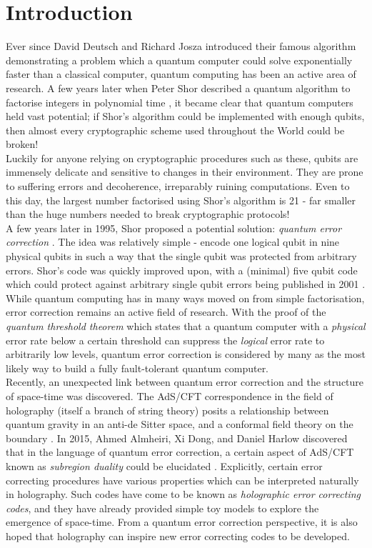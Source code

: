 \documentclass[12pt,a4paper]{report}
\numberwithin{equation}{section}
\theoremstyle{definition}
\theoremstyle{theorem}
\theoremstyle{theorem}
\theoremstyle{example}
\theoremstyle{definition}
\begin{document}
\chapter{Introduction}
Ever since David Deutsch and Richard Josza introduced their famous algorithm \cite{DJ} demonstrating a problem which a quantum computer could solve exponentially faster than a classical computer, quantum computing has been an active area of research. A few years later when Peter Shor described a quantum algorithm to factorise integers in polynomial time \cite{Shor}, it became clear that quantum computers held vast potential; if Shor's algorithm could be implemented with enough qubits, then almost every cryptographic scheme used throughout the World could be broken!\\
Luckily for anyone relying on cryptographic procedures such as these, qubits are immensely delicate and sensitive to changes in their environment. They are prone to suffering errors and decoherence, irreparably ruining computations. Even to this day, the largest number factorised using Shor's algorithm is 21 \cite{FactorRecord} - far smaller than the huge numbers needed to break cryptographic protocols!\\
A few years later in 1995, Shor proposed a potential solution: \textit{quantum error correction} \cite{PhysRevA.52.R2493}. The idea was relatively simple - encode one logical qubit in nine physical qubits in such a way that the single qubit was protected from arbitrary errors. Shor's code was quickly improved upon, with a (minimal) five qubit code which could protect against arbitrary single qubit errors being published in 2001 \cite{PhysRevLett.86.5811}.\\
While quantum computing has in many ways moved on from simple factorisation, error correction remains an active field of research. With the proof of the \textit{quantum threshold theorem} \cite{doi:10.1137/S0097539799359385}\cite{doi:10.1126/science.279.5349.342}\cite{KITAEV20032} which states that a quantum computer with a \textit{physical} error rate below a certain threshold can suppress the \textit{logical} error rate to arbitrarily low levels, quantum error correction is considered by many as the most likely way to build a fully fault-tolerant quantum computer.\\
Recently, an unexpected link between quantum error correction and the structure of space-time was discovered. The AdS/CFT correspondence in the field of holography (itself a branch of string theory) posits a relationship between quantum gravity in an anti-de Sitter space, and a conformal field theory on the boundary \cite{Maldacena}. In 2015, Ahmed Almheiri, Xi Dong, and Daniel Harlow discovered that in the language of quantum error correction, a certain aspect of AdS/CFT known as \textit{subregion duality} could be elucidated \cite{ADH}. Explicitly, certain error correcting procedures have various properties which can be interpreted naturally in holography. Such codes have come to be known as \textit{holographic error correcting codes}, and they have already provided simple toy models to explore the emergence of space-time. From a quantum error correction perspective, it is also hoped that holography can inspire new error correcting codes to be developed.\\
\end{document}
